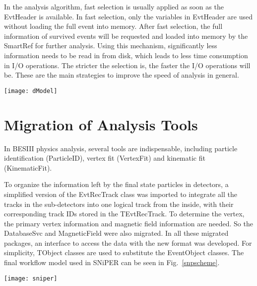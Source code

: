 \documentclass[a4paper,10pt,twoside]{cpc-hepnp}
\begin{document}
\begin{CJK*}{GB}{gbsn}
\begin{multicols}{2}
In the analysis algorithm, fast selection is usually applied as soon as the EvtHeader is available.
In fast selection, only the variables in EvtHeader are used without loading the full event into memory.
After fast selection, the full information of survived events will be requested and loaded into memory by the SmartRef for further analysis.
Using this mechanism, significantly less information needs to be read in from disk, which leads to less time consumption in I/O operations.
The stricter the selection is, the faster the I/O operations will be.
These are the main strategies to improve the speed of analysis in general.

\begin{center}
    \begin{center}
    \texttt{[image: dModel]}
    \end{center}
\end{center}


\section{Migration of Analysis Tools}

In BESIII physics analysis, several tools are indispensable, including particle identification (ParticleID), vertex fit (VertexFit) and kinematic fit (KinematicFit).

To organize the information left by the final state particles in detectors, a simplified version of the  EvtRecTrack class was imported to integrate all the tracks in the sub-detectors into one logical track from the inside, with their corresponding track IDs stored in the TEvtRecTrack.
To determine the vertex, the primary vertex information and magnetic field information are needed. So the DatabaseSvc and MagneticField were also migrated.
In all these migrated packages, an interface to access the data with the new format was developed. For simplicity, TObject classes are used to substitute the EventObject classes.
The final workflow model used  in SNiPER can be seen in Fig.~\ref{snpscheme}.

\begin{center}
\texttt{[image: sniper]}
\end{center}



\end{multicols}
\end{CJK*}
\end{document}
